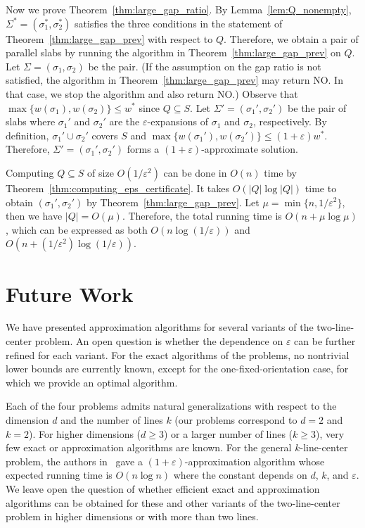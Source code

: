 \documentclass[10pt,a4paper]{article}
\theoremstyle{star}
\theoremstyle{claimstar}
\newcommand{\eps}{\ensuremath{\varepsilon}}
\begin{document}
Now we prove Theorem~\ref{thm:large_gap_ratio}.
By Lemma~\ref{lem:Q_nonempty}, $\Sigma^*=(\sigma_1^*, \sigma_2^*)$ satisfies the three conditions in the statement of Theorem~\ref{thm:large_gap_prev} with respect to $Q$. 
Therefore, we obtain a pair of parallel slabs by running the algorithm in Theorem~\ref{thm:large_gap_prev} on $Q$. 
Let $\Sigma=(\sigma_1, \sigma_2)$ be the pair. (If the assumption on the gap ratio is not satisfied, the algorithm in Theorem~\ref{thm:large_gap_prev} may return NO. In that case, we stop the algorithm and also return NO.) 
Observe that $\max\{w(\sigma_1), w(\sigma_2) \} \le w^*$ since $Q\subseteq S$. 
Let $\Sigma'= (\sigma_1', \sigma_2')$ be the pair of slabs where $\sigma_1'$ and  $\sigma_2'$ are the $\eps$-expansions of $\sigma_1$ and $\sigma_2$, respectively.
By definition, $\sigma_1'\cup \sigma_2'$ covers $S$ and $\max \{w(\sigma_1'), w(\sigma_2') \} \le (1+\eps)w^*$. 
Therefore, $\Sigma'= (\sigma_1', \sigma_2')$ forms a $(1+\eps)$-approximate solution. 

Computing $Q\subseteq S$ of size $O(1/\eps^2)$ can be done in $O(n)$ time by Theorem~\ref{thm:computing_eps_certificate}.
It takes $O(|Q|\log |Q|)$ time to obtain $(\sigma_1', \sigma_2')$ by Theorem~\ref{thm:large_gap_prev}. 
Let $\mu = \min \{n, 1/\eps^2\}$, then we have $|Q| = O(\mu)$. 
Therefore, the total running time is $O(n + \mu \log \mu)$, which can be expressed as both $O(n \log (1/\eps))$ and $O(n + (1/\eps^2) \log (1/\eps))$. 






\section{Future Work}

We have presented approximation algorithms for several variants of the two-line-center problem. An open question is whether the dependence on $\eps$ can be further refined for each variant. For the exact algorithms of the problems, no nontrivial lower bounds are currently known, except for the one-fixed-orientation case, for which we provide an optimal algorithm.

Each of the four problems admits natural generalizations with respect to the dimension $d$ and the number of lines $k$ (our problems correspond to $d=2$ and $k=2$). For higher dimensions ($d \ge 3$) or a larger number of lines ($k \ge 3$), very few exact or approximation algorithms are known. 
For the general $k$-line-center problem, the authors in~\cite{agarwal2005approximation} gave a $(1+\eps)$-approximation algorithm whose expected running time is $O(n\log n)$ where the constant depends on $d$, $k$, and $\eps$. 
We leave open the question of whether efficient exact and approximation algorithms can be obtained for these and other variants of the two-line-center problem in higher dimensions or with more than two lines.
\end{document}

